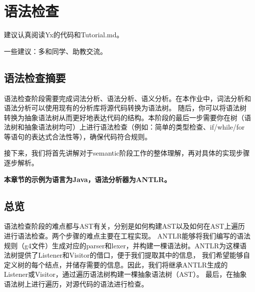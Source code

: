 \chapter{语法检查}

\begin{introduction}
    \item 建议认真阅读Yx的代码和Tutorial.md。
    \item 一些建议：多和同学、助教交流。
\end{introduction}


\section{语法检查摘要}
语法检查阶段需要完成词法分析、语法分析、语义分析。在本作业中，词法分析和语法分析可以使用现有的分析库将源代码转换为语法树。
随后，你可以将语法树转换为抽象语法树从而更好地表达代码的结构。本阶段的最后一步需要你在树（语法树和抽象语法树均可）上进行语法检查（例如：简单的类型检查、if/while/for等语句的表达式合法性等），确保代码符合规则。

接下来，我们将首先讲解对于semantic阶段工作的整体理解，再对具体的实现步骤逐步解析。

\begin{remark}
    \textbf{本章节的示例为语言为Java，语法分析器为ANTLR。}
\end{remark}

\section{总览}
语法检查阶段的难点都与AST有关，分别是如何构建AST以及如何在AST上遍历进行语法检查。两个步骤的难点主要在工程实现。
ANTLR能够将我们编写的语法规则（g4文件）生成对应的parser和lexer，并构建一棵语法树。ANTLR为这棵语法树提供了Listener和Visitor的借口，便于我们提取其中的信息，
我们希望能够自定义树的每个结点，并储存需要的信息。因此，我们将继承ANTLR生成的Listener或Visitor，通过遍历语法树构建一棵抽象语法树（AST）。
最后，在抽象语法树上进行遍历，对源代码的语法进行检查。

